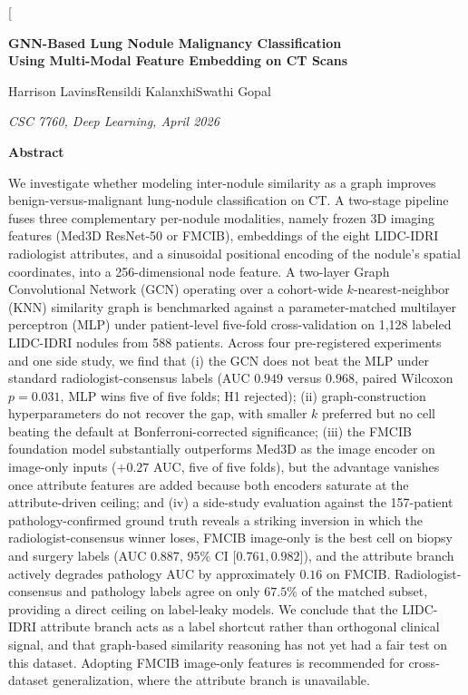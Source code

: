 \documentclass[10pt,letterpaper,twocolumn]{article}
\begin{document}
\twocolumn[%
  \begin{center}
    {\LARGE\bfseries GNN-Based Lung Nodule Malignancy Classification\\
     Using Multi-Modal Feature Embedding on CT Scans \par}
    \vspace{0.9em}
    {\large Harrison Lavins\quad Rensildi Kalanxhi\quad Swathi Gopal \par}
    \vspace{0.3em}
    {\small\itshape CSC 7760, Deep Learning, April 2026 \par}
  \end{center}
  \vspace{0.8em}
\begin{center}
\begin{minipage}{0.92\textwidth}
\begin{center}\textbf{Abstract}\end{center}
\small
We investigate whether modeling inter-nodule similarity as a graph improves benign-versus-malignant lung-nodule classification on CT. A two-stage pipeline fuses three complementary per-nodule modalities, namely frozen 3D imaging features (Med3D ResNet-50 or FMCIB), embeddings of the eight LIDC-IDRI radiologist attributes, and a sinusoidal positional encoding of the nodule's spatial coordinates, into a 256-dimensional node feature. A two-layer Graph Convolutional Network (GCN) operating over a cohort-wide $k$-nearest-neighbor (KNN) similarity graph is benchmarked against a parameter-matched multilayer perceptron (MLP) under patient-level five-fold cross-validation on 1{,}128 labeled LIDC-IDRI nodules from 588 patients. Across four pre-registered experiments and one side study, we find that (i) the GCN does not beat the MLP under standard radiologist-consensus labels (AUC $0.949$ versus $0.968$, paired Wilcoxon $p=0.031$, MLP wins five of five folds; H1 rejected); (ii) graph-construction hyperparameters do not recover the gap, with smaller $k$ preferred but no cell beating the default at Bonferroni-corrected significance; (iii) the FMCIB foundation model substantially outperforms Med3D as the image encoder on image-only inputs ($+0.27$ AUC, five of five folds), but the advantage vanishes once attribute features are added because both encoders saturate at the attribute-driven ceiling; and (iv) a side-study evaluation against the 157-patient pathology-confirmed ground truth reveals a striking inversion in which the radiologist-consensus winner loses, FMCIB image-only is the best cell on biopsy and surgery labels (AUC $0.887$, 95\% CI $\lbrack 0.761, 0.982 \rbrack$), and the attribute branch actively degrades pathology AUC by approximately $0.16$ on FMCIB. Radiologist-consensus and pathology labels agree on only $67.5\%$ of the matched subset, providing a direct ceiling on label-leaky models. We conclude that the LIDC-IDRI attribute branch acts as a label shortcut rather than orthogonal clinical signal, and that graph-based similarity reasoning has not yet had a fair test on this dataset. Adopting FMCIB image-only features is recommended for cross-dataset generalization, where the attribute branch is unavailable.

\end{minipage}
\end{center}
\end{document}
